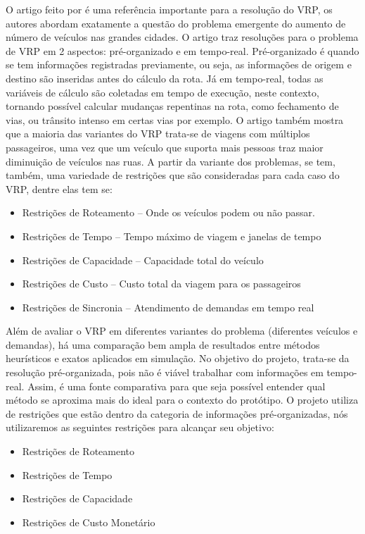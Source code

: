 O artigo feito por \cite{MOURAD2019323} é uma referência importante para a resolução do VRP, os autores abordam exatamente a questão do problema emergente do aumento de número de veículos nas grandes cidades. O artigo traz resoluções para o problema de VRP em 2 aspectos: pré-organizado e em tempo-real. Pré-organizado é quando se tem informações  registradas previamente, ou seja, as informações de origem e destino são inseridas antes do cálculo da rota. Já em tempo-real, todas as variáveis de cálculo são coletadas em tempo de execução, neste contexto, tornando possível calcular mudanças repentinas na rota, como fechamento de vias, ou trânsito intenso em certas vias por exemplo. O artigo também mostra que a maioria das variantes do VRP trata-se de viagens com múltiplos passageiros, uma vez que um veículo que suporta mais pessoas traz maior diminuição de veículos nas ruas.
A partir da variante dos problemas, se tem, também, uma variedade de restrições que são consideradas para cada caso do VRP, dentre elas tem se:

\begin{itemize}
\item Restrições de Roteamento -- Onde os veículos podem ou não passar.
\item Restrições de Tempo -- Tempo máximo de viagem e janelas de tempo
\item Restrições de Capacidade -- Capacidade total do veículo
\item Restrições de Custo -- Custo total da viagem para os passageiros
\item Restrições de Sincronia -- Atendimento de demandas em tempo real
\end{itemize}

 Além de avaliar o VRP em diferentes variantes do problema (diferentes veículos e demandas), há uma comparação bem ampla de resultados entre métodos heurísticos e exatos aplicados em simulação. No objetivo do projeto, trata-se da resolução pré-organizada, pois não é viável trabalhar com informações em tempo-real. Assim, é uma fonte comparativa para que seja possível entender qual método se aproxima mais do ideal para o contexto do protótipo. O projeto utiliza de restrições que estão dentro da categoria de informações pré-organizadas, nós utilizaremos as seguintes restrições para alcançar seu objetivo:

\begin{itemize}
\item Restrições de Roteamento
\item Restrições de Tempo
\item Restrições de Capacidade
\item Restrições de Custo Monetário
\end{itemize}

